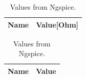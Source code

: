 \begin{table}[h]
	\centering
	\begin{tabular}{|l|r|}
		\hline    
		{\bf Name} & {\bf Value[Ohm]} \\ \hline
    		
    		
	\end{tabular}
	
	\caption{Values from Ngspice.}
    
\label{tab:imp_sim}
\end{table}

\begin{table}[h]
	\centering
	\begin{tabular}{|l|r|}
		\hline    
		{\bf Name} & {\bf Value} \\ \hline
    		
	\end{tabular}
	
	\caption{Values from Ngspice.}
    
\label{tab:merit}
\end{table}


